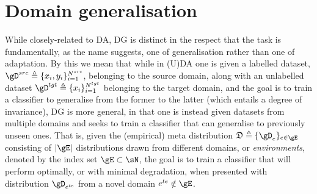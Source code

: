 \section{Domain generalisation}\label{sec:domain_generalisation}
While closely-related to \ac{DA}, \acf{DG} is distinct in the respect that the task is
fundamentally, as the name suggests, one of \ood{} generalisation rather than one of adaptation.
%
By this we mean that while in (U)DA one is given a labelled dataset, \( \gD^{src} \triangleq
\{x_i, y_i \}_{i=1}^{N^{src}} \), belonging to the source domain, along with an unlabelled
dataset \( \gD^{tgt} \triangleq \{ x_i \}_{i=1}^{N^{tgt}} \) belonging to the target domain,
and the goal is to train a classifier to generalise from the former to the latter (which entails a
degree of invariance), \ac{DG} is more general, in that one is instead given datasets from multiple
domains and seeks to train a classifier that can generalise to previously unseen ones. 
%
That is, given the (empirical) meta distribution \( \mathfrak{D} \triangleq \{\gD_e \}_{e \in \gE}
\) consisting of \( |\gE| \) distributions drawn from different domains, or \emph{environments},
denoted by the index set \( \gE \subset \sN \), the goal is to train a classifier that will perform
optimally, or with minimal degradation, when presented with distribution \( \gD_{e^{te}} \) from a
novel domain \( e^{te} \notin  \gE \).

